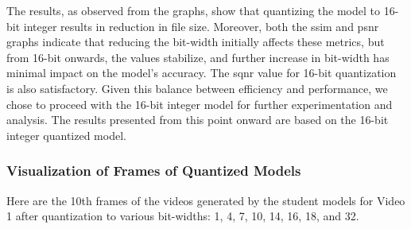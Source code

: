     The results, as observed from the graphs, show that quantizing the model to 16-bit integer results in reduction in file size. Moreover, both the \gls{ssim} and \gls{psnr} graphs indicate that reducing the bit-width initially affects these metrics, but from 16-bit onwards, the values stabilize, and further increase in bit-width has minimal impact on the model's accuracy. The \gls{sqnr} value for 16-bit quantization is also satisfactory. Given this balance between efficiency and performance, we chose to proceed with the 16-bit integer model for further experimentation and analysis. The results presented from this point onward are based on the 16-bit integer quantized model.

    \subsubsection{Visualization of Frames of Quantized Models}
    Here are the 10th frames of the videos generated by the student models for Video 1 after quantization to various bit-widths: 1, 4, 7, 10, 14, 16, 18, and 32.





